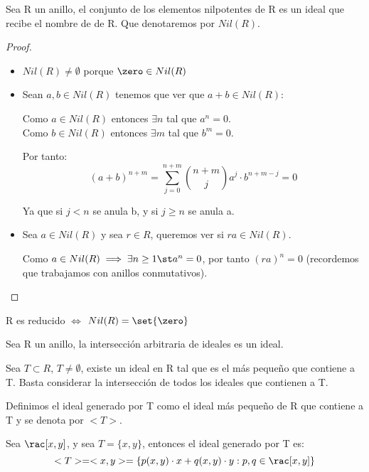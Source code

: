 \begin{lemma}
 Sea R un anillo, el conjunto de los elementos nilpotentes de R es un ideal que recibe el nombre de  de R. Que denotaremos por $Nil(R)$.
\end{lemma}
\begin{proof}
	\begin{itemize}
		\item $Nil(R) \neq \emptyset$ porque $\zero \in Nil(R)$
		\item Sean $a,b \in Nil(R)$ tenemos que ver que $a+b \in Nil(R)$:

		Como $a \in Nil(R)$ entonces $\exists n$ tal que $a^n=0$.\\
		Como $b \in Nil(R)$ entonces $\exists m$ tal que $b^m=0$.

		Por tanto:
		$$(a+b)^{n+m} = \sum_{j=0}^{n+m} \binom{n+m}{j} a^j \cdot b^{n+m-j} = 0$$

		Ya que si $j<n$ se anula b, y si $j \geq n$ se anula a.
		\item Sea $a \in Nil(R)$ y sea $r\in R$, queremos ver si $ra \in Nil(R)$.

		Como $a\in Nil(R) \implies \exists n \geq 1 \st a^n=0$, por tanto $(ra)^n = 0$ (recordemos que trabajamos con anillos conmutativos).
	\end{itemize}
\end{proof}

\obs R es reducido $\Leftrightarrow$ $Nil(R)=\set{\zero}$

\obs Sea R un anillo, la intersección arbitraria de ideales es un ideal.

\obs Sea $T \subset R$, $T \neq \emptyset$, existe un ideal en R tal que es el más pequeño que contiene a T. Basta considerar la intersección de todos los ideales que contienen a T.

\begin{defn}
Definimos el ideal generado por T como el ideal más pequeño de R que contiene a T y se denota por $<T>$.
\end{defn}

\begin{example} Sea $\rac[x,y]$, y sea $T=\{x,y\}$, entonces el ideal generado por T es:
	$$<T> = <x,y>= \{p(x,y)\cdot x+q(x,y)\cdot y : p,q \in \rac[x,y]\}$$
\end{example}


